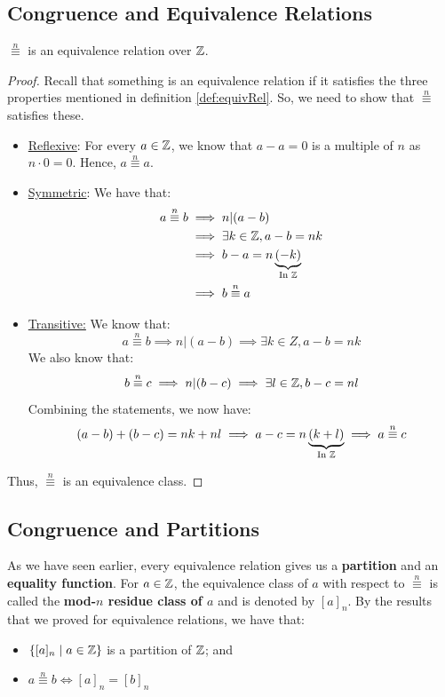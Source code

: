 \documentclass[letterpaper]{article}
\begin{document}
\subsection{Congruence and Equivalence Relations}
\begin{lemma}{}{}
    $\overset{n}{\equiv}$ is an equivalence relation over $\mathbb{Z}$. 
\end{lemma}
\begin{proof}
    Recall that something is an equivalence relation if it satisfies the three properties mentioned in definition \ref{def:equivRel}. So, we need to show that $\overset{n}{\equiv}$ satisfies these. 
    \begin{itemize}
        \item \underline{Reflexive}: For every $a \in \mathbb{Z}$, we know that $a - a = 0$ is a multiple of $n$ as $n \cdot 0 = 0$. Hence, $a \overset{n}{\equiv} a$. 
        \item \underline{Symmetric}: We have that: 
        \begin{equation*}
            \begin{aligned}
                a \overset{n}{\equiv} b &\implies n | (a - b) \\ 
                    &\implies \exists k \in \mathbb{Z}, a - b = nk \\ 
                    &\implies b - a = n\underbrace{(-k)}_{\text{In } \mathbb{Z}} \\ 
                    &\implies b \overset{n}{\equiv} a
            \end{aligned}
        \end{equation*}

        \item \underline{Transitive:} We know that:
        \[a \overset{n}{\equiv} b \implies n | (a - b) \implies \exists k \in Z, a - b = nk\]
        We also know that:
        \[b \overset{n}{\equiv} c \implies n | (b - c) \implies \exists l \in \mathbb{Z}, b - c = nl\]
        Combining the statements, we now have:
        \[(a - b) + (b - c) = nk + nl \implies a - c = n\underbrace{(k + l)}_{\text{In } \mathbb{Z}} \implies a \overset{n}{\equiv} c\]
    \end{itemize}
    Thus, $\overset{n}{\equiv}$ is an equivalence class. 
\end{proof}

\subsection{Congruence and Partitions}
As we have seen earlier, every equivalence relation gives us a \textbf{partition} and an \textbf{equality function}. For $a \in \mathbb{Z}$, the equivalence class of $a$ with respect to $\overset{n}{\equiv}$ is called the \textbf{mod-$n$ residue class of $a$} and is denoted by $[a]_n$. By the results that we proved for equivalence relations, we have that:
\begin{itemize}
    \item $\{[a]_n \mid a \in \mathbb{Z}\}$ is a partition of $\mathbb{Z}$; and 
    \item $a \overset{n}{\equiv} b \iff [a]_n = [b]_n$ 
\end{itemize}
\end{document}
